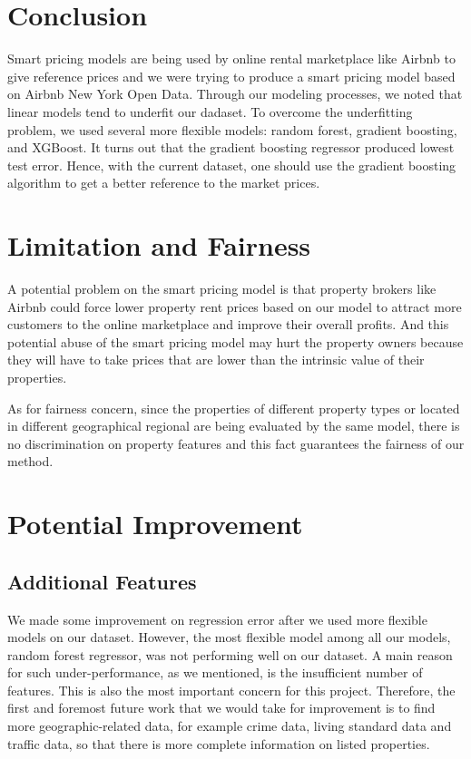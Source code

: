 \documentclass[twocolumn]{article}
\begin{document}
\section{Conclusion}

Smart pricing models are being used by online rental marketplace like Airbnb to give reference prices and we were trying to produce a smart pricing model based on Airbnb New York Open Data. Through our modeling processes, we noted that linear models tend to underfit our dadaset. To overcome the underfitting problem, we used several more flexible models: random forest, gradient boosting, and XGBoost. It turns out that the gradient boosting regressor produced lowest test error. Hence, with the current dataset, one should use the gradient boosting algorithm to get a better reference to the market prices. 

\section{Limitation and Fairness}
A potential problem on the smart pricing model is that property brokers like Airbnb could force lower property rent prices based on our model to attract more customers  to the online marketplace and improve their overall profits. And this potential abuse of the smart pricing model may hurt the property owners because they will have to take prices that are lower than the intrinsic value of their properties. 

As for fairness concern, since the properties of different property types or located in different geographical regional are being evaluated by the same model, there is no discrimination on property features and this fact guarantees the fairness of our method. 

\section{Potential Improvement}
\subsection{Additional Features}
We made some improvement on regression error after we used more flexible models on our dataset. However, the most flexible model among all our models, random forest regressor, was not performing well on our dataset. A main reason for such under-performance, as we mentioned, is the insufficient number of features. This is also the most important  concern for this project. Therefore, the first and foremost future work that we would take for improvement is to find more geographic-related data, for example crime data, living standard data and traffic data, so that there is more complete information on listed properties. 
\end{document}
